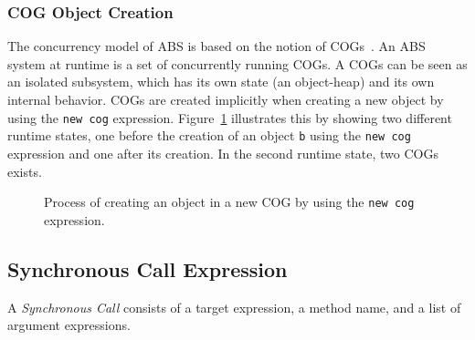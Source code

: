 \subsubsection{COG Object Creation}
The concurrency model of ABS is based on the notion of COGs~\cite{johnsen10fmco}.
An ABS system at runtime is a set of concurrently running COGs. A COGs can be seen as an isolated subsystem, which has its own state (an object-heap) and its own internal behavior.
COGs are created implicitly when creating a new object by using the \verb_new cog_ expression.
Figure~\ref{fig:newCogExpr} illustrates this by showing two different runtime states, one before the creation of an object \verb_b_ using the \verb_new cog_ expression and one after its creation. In the second runtime state, two COGs exists. 

\begin{figure}
\centering
{}
\caption{Process of creating an object in a new COG by using the \texttt{new cog} expression.}
\label{fig:newCogExpr}
\end{figure}


\subsection{Synchronous Call Expression}
A \emph{Synchronous Call} consists of a target expression, a method name, and a list of argument expressions.

